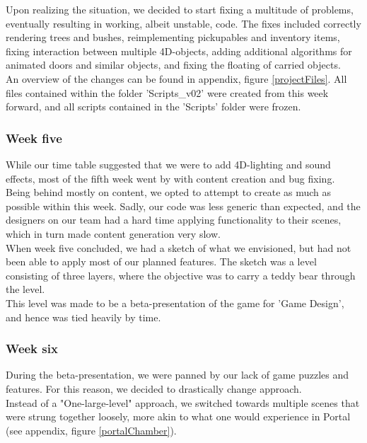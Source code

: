 Upon realizing the situation, we decided to start fixing a multitude of problems, eventually resulting in working, albeit unstable, code. The fixes included correctly rendering trees and bushes, reimplementing pickupables and inventory items, fixing interaction between multiple 4D-objects, adding additional algorithms for animated doors and similar objects, and fixing the floating of carried objects.\\

An overview of the changes can be found in appendix, figure \ref{projectFiles}. All files contained within the folder 'Scripts\_v02' were created from this week forward, and all scripts contained in the 'Scripts' folder were frozen.

\subsubsection{Week five}
While our time table suggested that we were to add 4D-lighting and sound effects, most of the fifth week went by with content creation and bug fixing.\\

Being behind mostly on content, we opted to attempt to create as much as possible within this week. Sadly, our code was less generic than expected, and the designers on our team had a hard time applying functionality to their scenes, which in turn made content generation very slow.\\

When week five concluded, we had a sketch of what we envisioned, but had not been able to apply most of our planned features. The sketch was a level consisting of three layers, where the objective was to carry a teddy bear through the level.\\

This level was made to be a beta-presentation of the game for 'Game Design', and hence was tied heavily by time.

\subsubsection{Week six}
During the beta-presentation, we were panned by our lack of game puzzles and features. For this reason, we decided to drastically change approach.\\

Instead of a "One-large-level" approach, we switched towards multiple scenes that were strung together loosely, more akin to what one would experience in Portal\cite{portalGame} (see appendix, figure \ref{portalChamber}).\\

